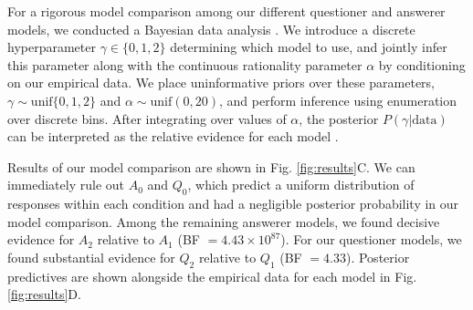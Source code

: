 \documentclass[12pt, floatsintext, jou]{apa6}
\newcommand{\ndg}[1]{\textcolor{Green}{[ndg: #1]}}
\begin{document}

For a rigorous model comparison among our different questioner and answerer models, we conducted a Bayesian data analysis \cite{LeeWagenmakers14_BDA}. We introduce a discrete hyperparameter $\gamma \in \{0, 1, 2\}$  determining which model to use, and jointly infer this parameter along with the continuous rationality parameter $\alpha$ by conditioning on our empirical data. 
We place uninformative priors over these parameters,
$\gamma \sim  \textrm{unif}\{0, 1, 2\}$ and 
$\alpha   \sim  \textrm{unif}(0,20)$, 
and perform inference using enumeration over discrete bins. 
After integrating over values of $\alpha$, the posterior $P(\gamma | \textrm{data})$ can be interpreted as the relative evidence for each model \cite{KruschkeVanPaemel15_OxfordHandbook}.

Results of our model comparison are shown in Fig. \ref{fig:results}C. We can immediately rule out $A_0$ and $Q_0$, which predict a uniform distribution of responses within each condition and had a negligible posterior probability in our model comparison. Among the remaining answerer models, we found decisive evidence for $A_2$ relative to $A_1$ (BF $= 4.43 \times 10^{87}$). For our questioner models, we found substantial evidence for $Q_2$ relative to $Q_1$ (BF $=4.33$). Posterior predictives are shown alongside the empirical data for each model in Fig. \ref{fig:results}D.%

%


%

%

\end{document}
